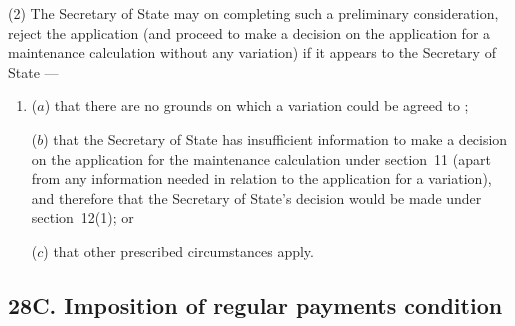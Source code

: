 \documentclass[12pt,a4paper]{article}
\begin{document}
(2) 
The Secretary of State may on completing such a  %
preliminary consideration, reject the application (and proceed to make 
a  %
decision on the application for a maintenance calculation without any variation) if it appears to 
the 
Secretary of State%
—
\begin{enumerate}\item[]
($a$) that there are no grounds on which 
a variation could be agreed to%
;

($b$) that 
the Secretary of State  %
has insufficient information to make a decision on the application for the maintenance calculation under section~11 (apart from any information needed in relation to the application for a variation), and therefore that 
the Secretary of State's  %
decision would be made under section~12(1); or

($c$) that other prescribed circumstances apply.
\end{enumerate}


\subsection{28C. Imposition of regular payments condition}
\end{document}
